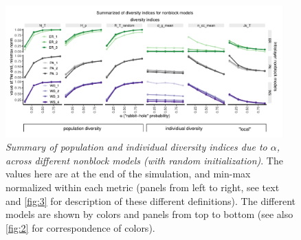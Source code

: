 \begin{figure}[H]
    \centering
    \includegraphics[width=0.95\textwidth,center]{../figures/report/Fig4.pdf}
    \caption{\label{fig:4}
    \textit{Summary of population and individual diversity indices due to $\alpha$, across different nonblock models (with random initialization)}. The values here are at the end of the simulation, and min-max normalized within each metric (panels from left to right, see text and \autoref{fig:3} for description of these different definitions). The different models are shown by colors and panels from top to bottom (see also \autoref{fig:2} for correspondence of colors).
    }
\end{figure}